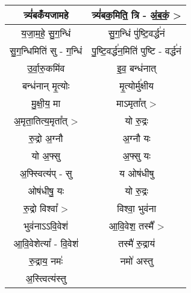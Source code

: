 \subsection{}
{\centering
\begin{longtable}{|c|c|}
\hline
त्र्यं॑बकंँयजामहे             & त्र्यं॑बक॒मिति॒ त्रि - अं॒ब॒कं॒ >\\
\hline
य॒जा॒म॒हे॒ सु॒ग॒न्धिं            & सु॒ग॒न्धिं पु॑ष्टि॒वर्द्ध॑नं\\
\hline
सु॒ग॒न्धिमिति॑ सु - ग॒न्धिं     & पु॒ष्टि॒वर्द्ध॑न॒मिति॑ पुष्टि - वर्द्ध॑नं\\
\hline
उ॒र्वा॒रु॒कमि॑व              & इ॒व॒ बन्ध॑नात्\\
\hline
बन्ध॑नान् मृ॒त्योः           & मृ॒त्योर्मु॑क्षीय\\
\hline
मु॒क्षी॒य॒ मा               & माऽमृता᳚त् >\\
\hline
अ॒मृता॒तित्य॒मृता᳚त् >         & यो रु॒द्रः\\
\hline
रु॒द्रो अ॒ग्नौ              & अ॒ग्नौ यः\\
\hline
यो अ॒फ्सु                 & अ॒फ्सु यः\\
\hline
अ॒फ्स्वित्य॑प् - सु           & य ओष॑धीषु\\
\hline
ओष॑धीषु॒ यः               & यो रु॒द्रः\\
\hline
रु॒द्रो विश्वा᳚ >           & विश्वा॒ भुव॑ना\\
\hline
भुव॑नाऽऽवि॒वेश॑             & आ॒वि॒वेश॒ तस्मै᳚ >\\
\hline
आ॒वि॒वेशेत्या᳚ - वि॒वेश॑        & तस्मै॑ रु॒द्राय॑\\
\hline
रु॒द्राय॒ नमः॑              & नमो॑ अस्तु\\
\hline
अ॒स्त्वित्य॑स्तु              & \\
\hline
\end{longtable}
}